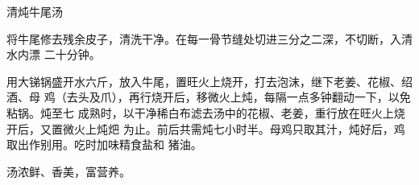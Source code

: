 \begin{recipe}{清炖牛尾汤}

\ingredients



\preparation

将牛尾修去残余皮子，清洗干净。在每一骨节缝处切进三分之二深，不切断，入清水内漂
二十分钟。

用大锑锅盛开水六斤，放入牛尾，置旺火上烧开，打去泡沫，继下老姜、花椒、绍酒、母
鸡（去头及爪），再行烧开后，移微火上炖，每隔一点多钟翻动一下，以免粘锅。炖至七
成熟时，以干净稀白布滤去汤中的花椒、老姜，重行放在旺火上烧开后，又置微火上炖𤆵
为止。前后共需炖七小时半。母鸡只取其汁，炖好后，鸡取出作别用。吃时加味精食盐和
猪油。

\features

汤浓鲜、香美，富营养。

\end{recipe}

